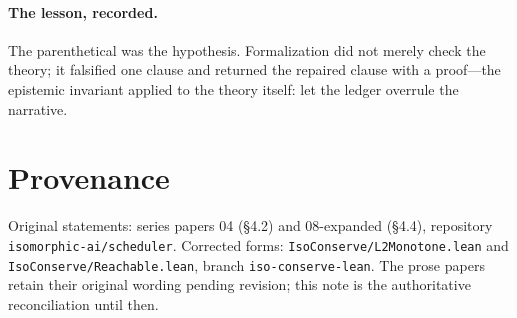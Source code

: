\documentclass[11pt]{article}
\begin{document}
\paragraph{The lesson, recorded.} The parenthetical was the hypothesis.
Formalization did not merely check the theory; it falsified one clause
and returned the repaired clause with a proof---the epistemic invariant
applied to the theory itself: let the ledger overrule the narrative.

\section{Provenance}
Original statements: series papers 04 (\S4.2) and 08-expanded (\S4.4),
repository \texttt{isomorphic-ai/scheduler}. Corrected forms:
\texttt{IsoConserve/L2Monotone.lean} and
\texttt{IsoConserve/Reachable.lean}, branch \texttt{iso-conserve-lean}.
The prose papers retain their original wording pending revision; this
note is the authoritative reconciliation until then.
\end{document}
